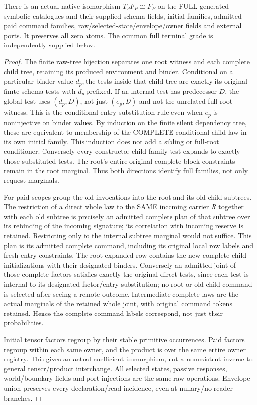 \documentclass[11pt]{article}
\begin{document}
\begin{lemma}
There is an actual native isomorphism $T_PF_P\cong F_P$ on the FULL generated symbolic catalogues and their supplied schema fields, initial families, admitted paid command families, raw/selected-state/envelope/owner fields and external ports. It preserves all zero atoms. The common full terminal grade is independently supplied below.
\end{lemma}
\begin{proof}
The finite raw-tree bijection separates one root witness and each complete child tree, retaining its produced environment and binder. Conditional on a particular binder value $d_p$, the tests inside that child tree are exactly its original finite schema tests with $d_p$ prefixed. If an internal test has predecessor $D$, the global test uses $(d_p,D)$, not just $(e_p,D)$ and not the unrelated full root witness. This is the conditional-entry substitution rule even when $e_p$ is noninjective on binder values. By induction on the finite silent dependency tree, these are equivalent to membership of the COMPLETE conditional child law in its own initial family. This induction does not add a sibling or full-root conditioner. Conversely every constructor child-family test expands to exactly those substituted tests. The root's entire original complete block constraints remain in the root marginal. Thus both directions identify full families, not only request marginals.

For paid scopes group the old invocations into the root and its old child subtrees. The restriction of a direct whole law to the SAME incoming carrier $R$ together with each old subtree is precisely an admitted complete plan of that subtree over its rebinding of the incoming signature; its correlation with incoming reserve is retained. Restricting only to the internal subtree marginal would not suffice. This plan is its admitted complete command, including its original local row labels and fresh-entry constraints. The root expanded row contains the new complete child initializations with their designated binders. Conversely an admitted joint of those complete factors satisfies exactly the original direct tests, since each test is internal to its designated factor/entry substitution; no root or old-child command is selected after seeing a remote outcome. Intermediate complete laws are the actual marginals of the retained whole joint, with original command tokens retained. Hence the complete command labels correspond, not just their probabilities.

Initial tensor factors regroup by their stable primitive occurrences. Paid factors regroup within each same owner, and the product is over the same entire owner registry. This gives an actual coefficient isomorphism, not a nonexistent inverse to general tensor/product interchange. All selected states, passive responses, world/boundary fields and port injections are the same raw operations. Envelope union preserves every declaration/read incidence, even at nullary/no-reader branches.\end{proof}
\end{document}
